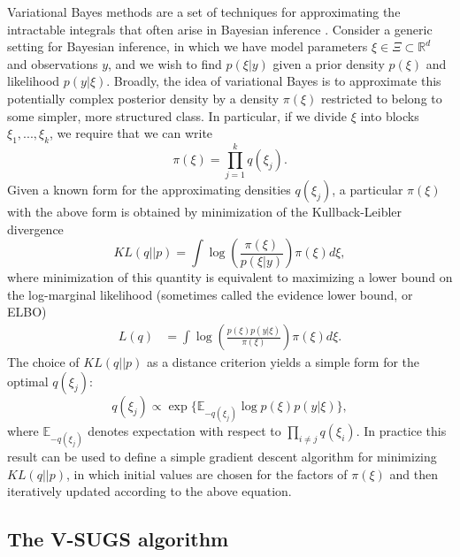 \documentclass{uwstat572}
\begin{document}
Variational Bayes methods are a set of techniques for approximating the intractable integrals that often arise in Bayesian inference \citep{jordan}. Consider a generic setting for Bayesian inference, in which we have model parameters $\xi \in \Xi \subset \mathbb{R}^d$ and observations $y$, and we wish to find $p(\xi | y)$ given a prior density $p(\xi)$ and likelihood $p(y | \xi)$. Broadly, the idea of variational Bayes is to approximate this potentially complex posterior density by a density $\pi(\xi)$ restricted to belong to some simpler, more structured class. In particular, if we divide $\xi$ into blocks $\xi_1,...,\xi_k$, we require that we can write 
$$ \pi(\xi) = \prod_{j=1}^k q(\xi_j).$$
Given a known form for the approximating densities $q(\xi_j)$, a particular $\pi(\xi)$ with the above form is obtained by minimization of the Kullback-Leibler divergence
$$ KL(q || p) = \int \log \left(\frac{\pi(\xi)}{p(\xi|y)}\right) \pi(\xi) d\xi,$$
where minimization of this quantity is equivalent to maximizing a lower bound on the log-marginal likelihood (sometimes called the evidence lower bound, or ELBO)
\begin{align} L(q) &= \int \log \left(\frac{p(\xi)p(y | \xi)}{\pi(\xi)} \right)\pi(\xi) d\xi. \label{eq:vbloglik} \end{align}
The choice of $KL(q||p)$ as a distance criterion yields a simple form for the optimal $q(\xi_j)$:
$$ q(\xi_j) \propto \exp\{ \mathbb{E}_{-q(\xi_j)} \log p(\xi) p(y | \xi) \},$$
where $ \mathbb{E}_{-q(\xi_j)}$ denotes expectation with respect to $\prod_{i\neq j} q(\xi_i)$. In practice this result can be used to define a simple gradient descent algorithm for minimizing $KL(q||p)$, in which initial values are chosen for the factors of $\pi(\xi)$ and then iteratively updated according to the above equation. 

\subsection{The V-SUGS algorithm}
\end{document}
